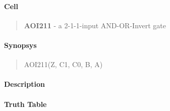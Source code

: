 \label{AOI211}
\paragraph{Cell}
\begin{quote}
    \textbf{AOI211} - a 2-1-1-input AND-OR-Invert gate
\end{quote}

\paragraph{Synopsys}
\begin{quote}
    AOI211(Z, C1, C0, B, A)
\end{quote}

\paragraph{Description}

%

\paragraph{Truth Table}



